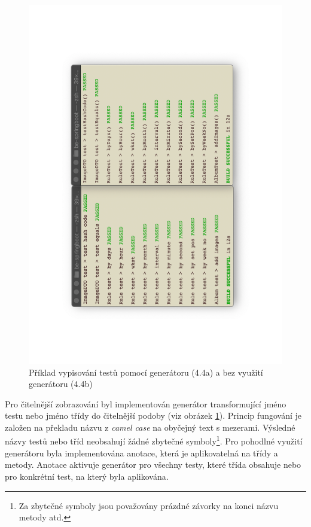     \begin{figure}\centering
	   \includegraphics[angle=-90, width=1.0\textwidth]{pdfs/pretty-tests-comparison}
	   \caption[Srovnaní zobrazováni kódu]{Příklad vypisování testů pomocí generátoru (4.4a) a bez využití generátoru (4.4b)}\label{image:pretty-tests-comparison}
    \end{figure}
    Pro čitelnější zobrazování byl implementován generátor transformující jméno testu nebo jméno třídy do čitelnější podoby (viz obrázek \ref{image:pretty-tests-comparison}). Princip fungování je založen na překladu názvu z \textit{camel case} na obyčejný text s mezerami. Výsledné názvy testů nebo tříd neobsahují žádné zbytečné symboly\footnote{Za zbytečné symboly jsou považovány prázdné závorky na konci názvu metody atd.}. Pro pohodlné využití generátoru byla implementována anotace, která je aplikovatelná na třídy a metody. Anotace aktivuje generátor pro všechny testy, které třída obsahuje nebo pro konkrétní test, na který byla aplikována.
    
